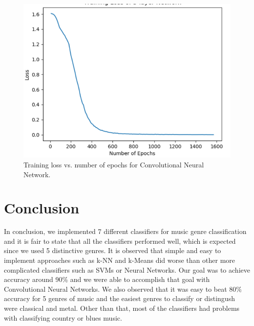 \begin{figure}
\begin{center}
\includegraphics[scale=0.2]{./figures/loss_cnn.png}
\end{center}
\caption
{
Training loss vs. number of epochs for Convolutional Neural Network.
}
\label{fig:big_picture5}
\end{figure}

\section{Conclusion}\label{sec:conclusion}
In conclusion, we implemented 7 different classifiers for music genre classification and it is fair to state that all the classifiers performed well, which is expected since we used 5 distinctive genres. It is observed that simple and easy to implement approaches such as k-NN and k-Means did worse than other more complicated classifiers such as SVMs or Neural Networks. Our goal was to achieve accuracy around 90\% and we were able to accomplish that goal with Convolutional Neural Networks. We also observed that it was easy to beat 80\% accuracy for 5 genres of music and the easiest genres to classify or distingush were classical and metal. Other than that, most of the classifiers had problems with classifying country or blues music.

